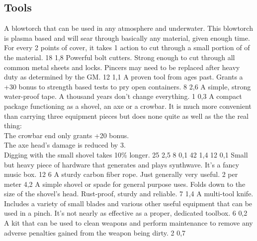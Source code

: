 \subsection{Tools}
\vspace{10mm}
\begin{multicols}{2}
    {A blowtorch that can be used in any atmosphere and underwater.
        This blowtorch is plasma based
        and will sear through basically any material,
        given enough time.\\
        For every 2 points of cover,
        it takes 1 action to cut through a small portion of of the material.}
    {18}
    {1,8}
    {Powerful bolt cutters.
        Strong enough to cut through all common metal sheets and locks.
        Pincers may need to be replaced after heavy duty as determined by the GM.}
    {12}
    {1,1}
    {A proven tool from ages past.
        Grants a +30 bonus to strength based tests to pry open containers.}
    {8}
    {2,6}
    {A simple, strong water-proof tape.
        A thousand years don't change everything.}
    {1}
    {0,3}
    {A compact package functioning as
        a shovel,
        an axe
        or a crowbar.
        It is much more convenient than carrying three equipment pieces
        but does none quite as well as the the real thing:\\
	The crowbar end only grants +20 bonus.\\
	The axe head's damage is reduced by 3.\\
	Digging with the small shovel takes 10\% longer.}
    {25}
    {2,5}
    {8}
    {0,1}
    {42}
    {1,4}
    {12}
    {0,1}
    {Small but heavy piece of hardware that generates and plays synthwave.
        It’s a fancy music box.}
    {12}
    {6}
    {A sturdy carbon fiber rope. Just generally very useful.}
    {2 per meter}
    {4,2}
    {A simple shovel or spade for general purpose uses.
        Folds down to the size of the shovel’s head.
        Rust-proof, sturdy and reliable.}
    {7}
    {1,4}
    {A multi-tool knife.
        Includes a variety of small blades and various other useful equipment
        that can be used in a pinch.
        It's not nearly as effective as a proper, dedicated toolbox.}
    {6}
    {0,2}
    {A kit that can be used to clean weapons and perform maintenance
        to remove any adverse penalties gained from the weapon being dirty.}
    {2}
    {0,7}
\end{multicols}

